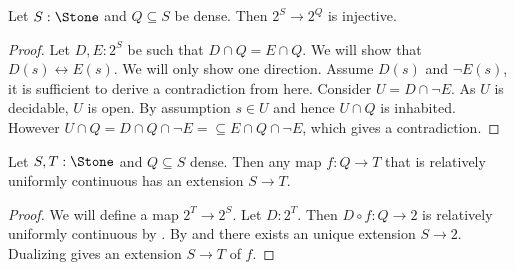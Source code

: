 \begin{lemma}\label{UniformDecidableUniqueExtension}
  Let $S:\Stone$ and $Q\subseteq S$ be dense. Then $2^S \to 2^Q$ is injective. 
\end{lemma}
\begin{proof}
  Let $D,E:2^S$ be such that $D \cap Q= E \cap Q$. We will show that $D(s)\leftrightarrow E(s)$. We will only show one direction. Assume $D(s)$ and $\neg E(s)$, it is sufficient to derive a contradiction from here. 
  Consider $U = D \cap \neg E$. As $U$ is decidable, $U$ is open. By assumption $s\in U$ and hence $U \cap Q$ is inhabited. However $U \cap Q = D \cap Q \cap \neg E = \subseteq E \cap Q \cap \neg E$, which gives a contradiction. 
\end{proof}

\begin{theorem}
  Let $S,T:\Stone$ and $Q\subseteq S$ dense. Then any map $f:Q \to T$ that is relatively uniformly continuous has an extension $S\to T$. 
\end{theorem}
\begin{proof}
We will define a map $2^T \to 2^S$. Let $D:2^T$. Then $D \circ f: Q \to 2$ is relatively uniformly continuous by . By  and  there exists an unique extension $S \to 2$. Dualizing gives an extension $S \to T$ of $f$. 
\end{proof}

